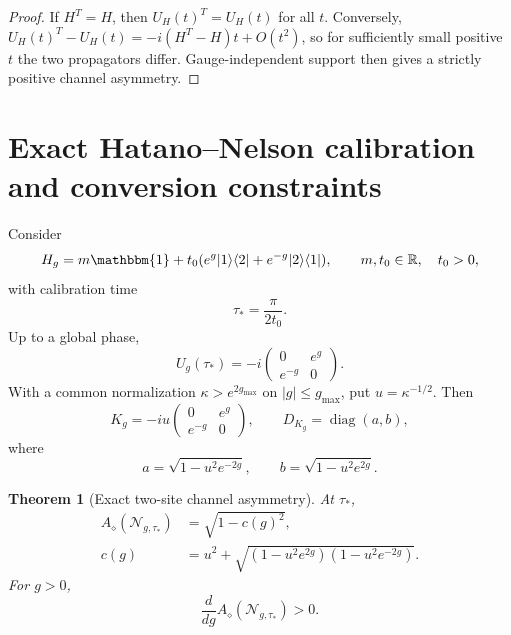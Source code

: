 \documentclass[reprint,amsmath,amssymb,aps,nofootinbib]{revtex4-2}
\newtheorem{theorem}{Theorem}
\newcommand{\id}{\mathbbm{1}}
\newcommand{\diag}{\operatorname{diag}}
\begin{document}
\begin{proof}
If $H^T=H$, then $U_H(t)^T=U_H(t)$ for all $t$. Conversely,
$U_H(t)^T-U_H(t)=-i(H^T-H)t+O(t^2)$, so for sufficiently small positive $t$ the two propagators
differ. Gauge-independent support then gives a strictly positive channel asymmetry.
\end{proof}

\section{Exact Hatano--Nelson calibration and conversion constraints}
\label{sec:hn}

Consider
\begin{equation}
H_g=m\id+t_0(e^g|1\rangle\langle2|+e^{-g}|2\rangle\langle1|),
\qquad m,t_0\in\mathbb R,\quad t_0>0,
\end{equation}
with calibration time
\begin{equation}
\tau_* = \frac{\pi}{2t_0}.
\end{equation}
Up to a global phase,
\begin{equation}
U_g(\tau_*)=-i
\begin{pmatrix}0&e^g\\ e^{-g}&0\end{pmatrix}.
\end{equation}
With a common normalization $\kappa>e^{2g_{\max}}$ on $|g|\le g_{\max}$, put
$u=\kappa^{-1/2}$. Then
\begin{equation}
K_g=-iu\begin{pmatrix}0&e^g\\e^{-g}&0\end{pmatrix},
\qquad
D_{K_g}=\diag(a,b),
\end{equation}
where
\begin{equation}
a=\sqrt{1-u^2e^{-2g}},
\qquad
b=\sqrt{1-u^2e^{2g}}.
\end{equation}

\begin{theorem}[Exact two-site channel asymmetry]
At $\tau_*$,
\begin{equation}
\boxed{\begin{aligned}
A_\diamond(\mathcal N_{g,\tau_*})
&=\sqrt{1-c(g)^2},\\
c(g)&=u^2+\sqrt{(1-u^2e^{2g})(1-u^2e^{-2g})}.
\end{aligned}}
\end{equation}
For $g>0$,
\begin{equation}
\boxed{\frac{d}{dg}A_\diamond(\mathcal N_{g,\tau_*})>0.}
\end{equation}
\end{theorem}
\end{document}
